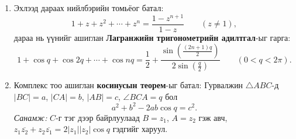 \begin{enumerate}[label=\textbf{3.\arabic*}, itemsep=8pt]
\item Эхлээд дараах нийлбэрийн томьёог батал:
\[
1+z+z^2+\cdots+z^n=\frac{1-z^{n+1}}{1-z}\qquad (z\ne 1),
\]
дараа нь үүнийг ашиглан \textbf{Лагранжийн тригонометрийн адилтгал}-ыг гарга:
\[
1+\cos q+\cos 2q+\cdots+\cos nq
=
\frac12+\frac{\sin\left(\frac{(2n+1)q}{2}\right)}{2\sin\left(\frac{q}{2}\right)}
\qquad (0<q<2\pi).
\]

\item Комплекс тоо ашиглан \textbf{косинусын теорем}-ыг батал:
Гурвалжин $\triangle ABC$-д $|BC|=a$, $|CA|=b$, $|AB|=c$, $\angle BCA=q$ бол
\[
a^2+b^2-2ab\cos q=c^2.
\]
\textit{Санамж:} $C$-г тэг дээр байрлуулаад $B=z_1$, $A=z_2$ гэж авч,
$z_1\overline{z_2}+z_2\overline{z_1}=2|z_1||z_2|\cos q$ гэдгийг харуул.

\end{enumerate}